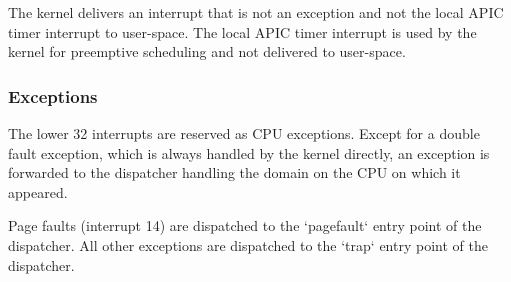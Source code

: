 \documentclass{scrreprt}
\begin{document}
  The kernel delivers an interrupt that is not an exception and not
  the local APIC timer interrupt to user-space. The local APIC timer
  interrupt is used by the kernel for preemptive scheduling and not
  delivered to user-space.

  \subsubsection{Exceptions}

  The lower 32 interrupts are reserved as CPU exceptions. Except for a
  double fault exception, which is always handled by the kernel
  directly, an exception is forwarded to the dispatcher handling the
  domain on the CPU on which it appeared.

  Page faults (interrupt 14) are dispatched to the `pagefault` entry
  point of the dispatcher. All other exceptions are dispatched to the
  `trap` entry point of the dispatcher.



\end{document}

